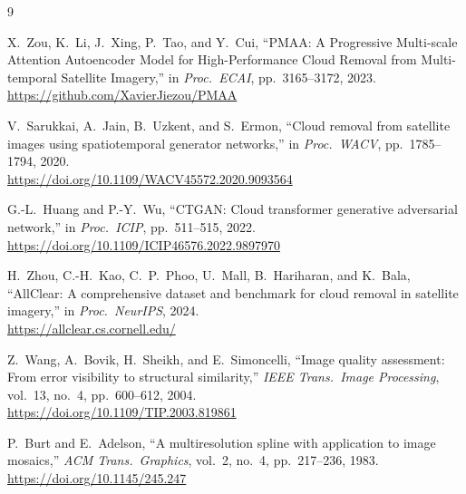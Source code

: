 \documentclass[12pt,a4paper]{article}
\begin{document}
\begin{thebibliography}{9}

X.~Zou, K.~Li, J.~Xing, P.~Tao, and Y.~Cui,
``PMAA: A Progressive Multi-scale Attention Autoencoder Model for High-Performance Cloud Removal from Multi-temporal Satellite Imagery,''
in \textit{Proc.\ ECAI}, pp.~3165--3172, 2023.
\\\url{https://github.com/XavierJiezou/PMAA}

V.~Sarukkai, A.~Jain, B.~Uzkent, and S.~Ermon,
``Cloud removal from satellite images using spatiotemporal generator networks,''
in \textit{Proc.\ WACV}, pp.~1785--1794, 2020.
\\\url{https://doi.org/10.1109/WACV45572.2020.9093564}

G.-L.~Huang and P.-Y.~Wu,
``CTGAN: Cloud transformer generative adversarial network,''
in \textit{Proc.\ ICIP}, pp.~511--515, 2022.
\\\url{https://doi.org/10.1109/ICIP46576.2022.9897970}

H.~Zhou, C.-H.~Kao, C.~P.~Phoo, U.~Mall, B.~Hariharan, and K.~Bala,
``AllClear: A comprehensive dataset and benchmark for cloud removal in satellite imagery,''
in \textit{Proc.\ NeurIPS}, 2024.
\\\url{https://allclear.cs.cornell.edu/}

Z.~Wang, A.~Bovik, H.~Sheikh, and E.~Simoncelli,
``Image quality assessment: From error visibility to structural similarity,''
\textit{IEEE Trans.\ Image Processing}, vol.~13, no.~4, pp.~600--612, 2004.
\\\url{https://doi.org/10.1109/TIP.2003.819861}

P.~Burt and E.~Adelson,
``A multiresolution spline with application to image mosaics,''
\textit{ACM Trans.\ Graphics}, vol.~2, no.~4, pp.~217--236, 1983.
\\\url{https://doi.org/10.1145/245.247}

\end{thebibliography}
\end{document}

